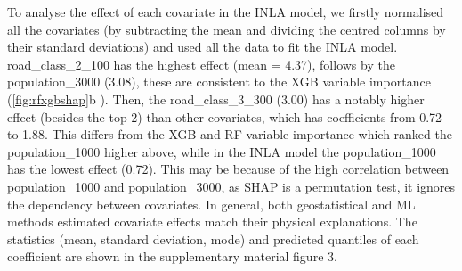 \documentclass{article}
\begin{document}
To analyse the effect of each covariate in the INLA model, we firstly normalised all the covariates (by subtracting the mean and dividing the centred columns by their standard deviations) and used all the data to fit the INLA model. road\_class\_2\_100 has the highest effect (mean = 4.37), follows by the population\_3000 (3.08), these are consistent to the XGB variable importance (\cref{fig:rfxgbshap}b ). Then, the road\_class\_3\_300 (3.00) has a notably higher effect (besides the top 2) than other covariates, which has coefficients from 0.72 to 1.88. This differs from the XGB and RF variable importance which ranked the population\_1000 higher above, while in the INLA model the population\_1000 has the lowest effect (0.72). This may be because of the high correlation between population\_1000 and population\_3000, as SHAP is a permutation test, it ignores the dependency between covariates. In general, both geostatistical and ML methods estimated covariate effects match their physical explanations. The statistics (mean, standard deviation, mode) and predicted quantiles of each coefficient are shown in the supplementary material figure 3. 
\end{document}
